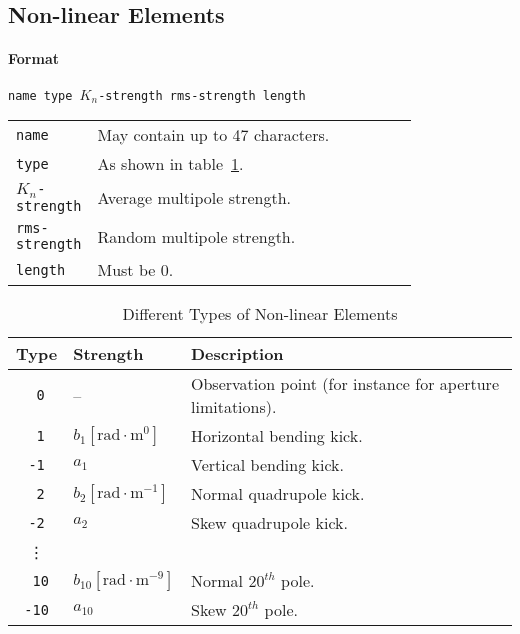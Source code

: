 \subsection{Non-linear Elements} \label{NonEle}

\paragraph{Format} \texttt{name type $K_{n}$-strength rms-strength length}

\bigskip
\begin{tabular}{@{}lp{0.8\linewidth}}
    \texttt{name} & May contain up to 47 characters. \\
    \texttt{type} & As shown in table~\ref{T-NonEle}. \\
    \texttt{$K_{n}$-strength} & Average multipole strength. \\
    \texttt{rms-strength} & Random multipole strength. \\
    \texttt{length} & Must be 0.
\end{tabular}

\begin{table}[h]
    \caption{Different Types of Non-linear Elements}
    \label{T-NonEle}
    \centering
    \renewcommand{\arraystretch}{1.5}
    \begin{tabular}{|c|l|l|}
        \hline
        \rowcolor{blue!30}
        \textbf{Type} & \textbf{Strength} & \textbf{Description} \\
        \hline
        \texttt{~0} & -- & Observation point (for instance for aperture limitations). \\
        \hline
        \texttt{~1} & $b_{1} [\mathrm{rad} \cdot \mathrm{m}^{0}]$ & Horizontal bending kick. \\
        \texttt{-1} & $a_{1}$ & Vertical bending kick. \\
        \hline
        \texttt{~2} & $b_{2} [\mathrm{rad} \cdot \mathrm{m}^{-1}]$ & Normal quadrupole kick. \\
        \texttt{-2} & $a_{2}$ & Skew quadrupole kick. \\
        \hline
        \vdots & & \\
        \hline
        \texttt{~10} & $b_{10} [\mathrm{rad} \cdot \mathrm{m}^{-9}]$ & Normal $20^{th}$ pole. \\
        \texttt{-10} & $a_{10}$ & Skew $20^{th}$ pole. \\
        \hline
    \end{tabular}
\end{table}


